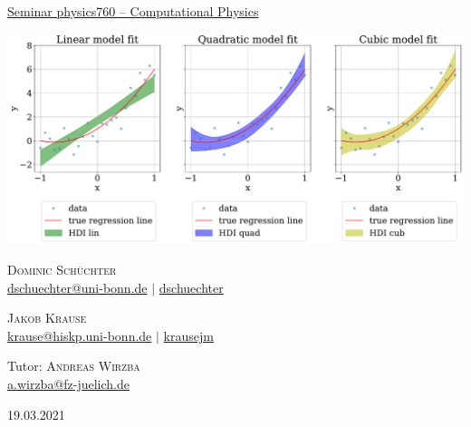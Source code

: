 \documentclass[11pt,aspectratio=1610,dvipsnames]{beamer}
\begin{document}
\begin{frame}[plain]
	\setcounter{page}{0}
	\centering
	{\Large {}}\\
	{\href{https://www.youtube.com/watch?v=oHg5SJYRHA0}{Seminar physics760 -- Computational Physics}}
	\vfill
	
	\includegraphics[width=0.8\linewidth]{figs/HDI_sigma_07a.pdf}
	\vfill
	\begin{minipage}{\linewidth}
		\centering
		\begin{minipage}{0.45\linewidth}
			\centering
			\textsc{Dominic Schüchter}\\
			\scriptsize \href{mailto:dschuechter@uni-bonn.de}{\faEnvelope  \hspace*{0.1cm}dschuechter@uni-bonn.de} {\color{black}$|$} \href{https://github.com/dschuechter}{\faGithub  \hspace*{0.1cm}dschuechter}\\
		\end{minipage}
		\begin{minipage}{0.45\linewidth}
			\centering
			\textsc{Jakob Krause}\\
			\scriptsize \href{mailto:krause@hiskp.uni-bonn.de}{\faEnvelope  \hspace*{0.1cm}krause@hiskp.uni-bonn.de} {\color{black}$|$} \href{https://github.com/krausejm}{\faGithub  \hspace*{0.1cm}krausejm}\\
		\end{minipage}
	\vspace{.5cm}
	
	Tutor: \textsc{Andreas Wirzba}\\
	\scriptsize \href{mailto:a.wirzba@fz-juelich.de}{\faEnvelope  \hspace*{0.1cm}a.wirzba@fz-juelich.de}
	\end{minipage}
	\vspace{0.2cm}
	
	19.03.2021
	 
	
 		
\end{frame}
\end{document}
